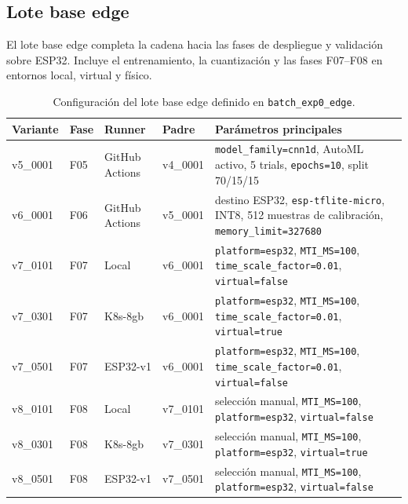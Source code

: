 \subsection{Lote base edge}
\label{anexo:batch-exp0-edge}

El lote base edge completa la cadena hacia las fases de despliegue y validación sobre ESP32. Incluye el entrenamiento, la cuantización y las fases F07--F08 en entornos local, virtual y físico.

\begin{table}[htbp]
    \centering
    \caption{Configuración del lote base edge definido en \texttt{batch\_exp0\_edge}.}
    \label{tab:params-batch-exp0-edge}
    \begin{tabular}{p{}p{}p{}p{}p{}}
        \hline
        \textbf{Variante} & \textbf{Fase} & \textbf{Runner} & \textbf{Padre} & \textbf{Parámetros principales} \\
        \hline
        v5\_0001 & F05 & GitHub Actions & v4\_0001 & \texttt{model\_family=cnn1d}, AutoML activo, 5 trials, \texttt{epochs=10}, split 70/15/15 \\
        v6\_0001 & F06 & GitHub Actions & v5\_0001 & destino ESP32, \texttt{esp-tflite-micro}, INT8, 512 muestras de calibración, \texttt{memory\_limit=327680} \\
        v7\_0101 & F07 & Local & v6\_0001 & \texttt{platform=esp32}, \texttt{MTI\_MS=100}, \texttt{time\_scale\_factor=0.01}, \texttt{virtual=false} \\
        v7\_0301 & F07 & K8s-8gb & v6\_0001 & \texttt{platform=esp32}, \texttt{MTI\_MS=100}, \texttt{time\_scale\_factor=0.01}, \texttt{virtual=true} \\
        v7\_0501 & F07 & ESP32-v1 & v6\_0001 & \texttt{platform=esp32}, \texttt{MTI\_MS=100}, \texttt{time\_scale\_factor=0.01}, \texttt{virtual=false} \\
        v8\_0101 & F08 & Local & v7\_0101 & selección manual, \texttt{MTI\_MS=100}, \texttt{platform=esp32}, \texttt{virtual=false} \\
        v8\_0301 & F08 & K8s-8gb & v7\_0301 & selección manual, \texttt{MTI\_MS=100}, \texttt{platform=esp32}, \texttt{virtual=true} \\
        v8\_0501 & F08 & ESP32-v1 & v7\_0501 & selección manual, \texttt{MTI\_MS=100}, \texttt{platform=esp32}, \texttt{virtual=false} \\
        \hline
    \end{tabular}
\end{table}

